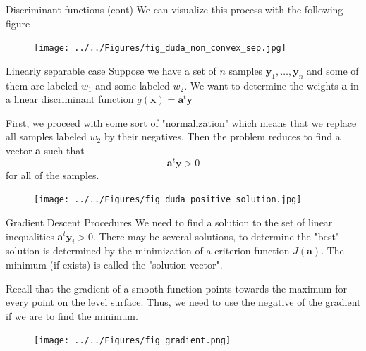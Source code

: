 \documentclass{beamer}
\begin{document}
\begin{frame}{Discriminant functions (cont)}
	We can visualize this process with the following figure
	\begin{figure}
		\centering
		\texttt{[image: ../../Figures/fig\_duda\_non\_convex\_sep.jpg]}
	\end{figure}
\end{frame}
\begin{frame}{Linearly separable case }
	Suppose we have a set of $n$ samples $\mathbf{y}_1,\ldots,\mathbf{y}_n$ and some of them are labeled $w_1$ and some labeled $w_2$. We want to determine the weights $\mathbf{a}$ in a linear discriminant function $g(\mathbf{x})=\mathbf{a}^t \mathbf{y}$
	
	First, we proceed with some sort of "normalization" which means that we replace all samples labeled $w_2$ by their negatives. Then the problem reduces to find a vector $\mathbf{a}$ such that 
	\begin{equation*}
		\mathbf{a}^t \mathbf y > 0
	\end{equation*}
for all of the samples. 

\begin{figure}
	\centering
	\texttt{[image: ../../Figures/fig\_duda\_positive\_solution.jpg]}
\end{figure}
\end{frame}

\begin{frame}{Gradient Descent Procedures}
		We need to find a solution to the set of linear inequalities $\mathbf{a}^t\mathbf{y}_i >0$. There may be several solutions, to determine the "best" solution is determined by the minimization of a criterion function $J(\mathbf{a})$.  The minimum (if exists) is called the "solution vector".

Recall that the gradient of a smooth function points towards the maximum for every point on the level surface. Thus, we need to use the negative of the gradient if we are to find the minimum.

\begin{figure}
	\centering
	\texttt{[image: ../../Figures/fig\_gradient.png]}
\end{figure}
\end{frame}
\end{document}
